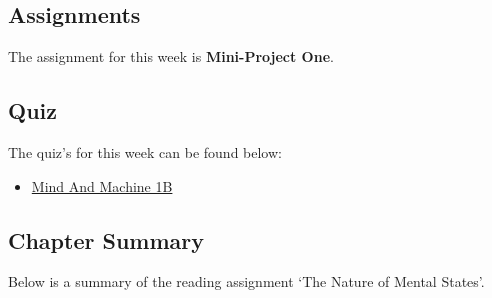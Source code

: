 \subsection{Assignments}

The assignment for this week is \textbf{Mini-Project One}.  

\subsection{Quiz}

The quiz's for this week can be found below:

\begin{itemize}
    \item \href{https://applied.cs.colorado.edu/mod/quiz/view.php?id=49332}{Mind And Machine 1B}  
\end{itemize}

\subsection{Chapter Summary}

Below is a summary of the reading assignment `The Nature of Mental States'.

